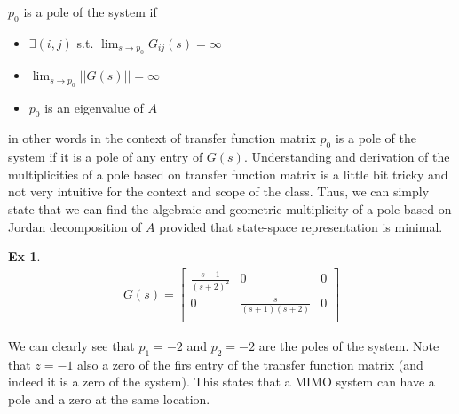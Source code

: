 \documentclass[twoside]{article}
\newtheorem{exmp}[theorem]{Ex}
\begin{document}
$p_0$ is a pole of the system if 
%
\begin{itemize}
 \item $\exists (i,j)$ s.t. $\lim_{s \to p_0}G_{ij}(s) = \infty$
 \item $\lim_{s \to p_0} || G(s) || = \infty$
 \item $p_0$ is an eigenvalue of $A$
\end{itemize}
%
in other words in the context of transfer function matrix $p_0$ is a pole of the system if it is a pole of any entry of
$G(s)$. Understanding and derivation of the multiplicities of a pole based on transfer function matrix is a little bit tricky 
and not very intuitive for the context and scope of the class. Thus, we can simply state that we can find the algebraic and
geometric multiplicity of a pole based on Jordan decomposition of $A$ provided that state-space representation is minimal. 
%
\begin{exmp}
	\begin{align*}
	G(s) = \left[ \begin{array}{ccc} \frac{s+1}{(s+2)^2} & 0 & 0 \\  
	0 & \frac{s}{(s+1)(s+2)} & 0 \\  \end{array} \right]
	\end{align*}
\end{exmp}
%
We can clearly see that $p_1 = -2$ and $p_2 = -2$ are the poles of the system. Note that $z = -1$ also a zero of the 
firs entry of the transfer function matrix (and indeed it is a zero of the system). This states that a MIMO system can have 
a pole and a zero at the same location. 


\end{document}
